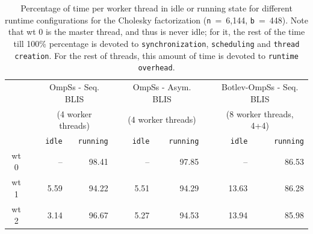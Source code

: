 \begin{table}
\centering
\caption{Percentage of time per worker thread in idle or running state for different runtime configurations for the Cholesky factorization 
({\tt n}~=~6,144, {\tt b}~=~448).
Note that {\sc wt 0} is the master thread, and thus is never idle; for it, the rest of the time till
100\% percentage is devoted to {\tt synchronization}, {\tt scheduling} and {\tt thread creation}. For the rest of threads, this amount of time is devoted to {\tt runtime overhead}.}
\label{tab:th_state}

\ca{2pt}

\renewcommand{\fg}[1]{{#1}} 
\renewcommand{\br}[1]{{#1}} 

{\scriptsize
\begin{tabular}{crrrrrrrrr} 
   	\toprule
                 & \phantom{a} & \multicolumn{2}{c}{OmpSs - Seq. BLIS} & \phantom{ab} & \multicolumn{2}{c}{OmpSs - Asym. BLIS} & \phantom{ab} & \multicolumn{2}{c}{Botlev-OmpSs - Seq. BLIS} \\ 
                 & \phantom{a} & \multicolumn{2}{c}{(4 worker threads)} & \phantom{ab} & \multicolumn{2}{c}{(4 worker threads)} & \phantom{ab} & \multicolumn{2}{c}{(8 worker threads, 4+4)} \\ 
                                          \cmidrule{3-4}                                         \cmidrule{6-7}                                      \cmidrule{9-10}
                       & \phantom{a} &    {\tt idle}& {\tt running}& \phantom{ab}  & {\tt idle}& {\tt running}& \phantom{ab} & {\tt idle}  & {\tt running} \\ \hline 
	 {\sc wt 0}    & \phantom{a} &    \fg{--}   & \fg{98.41}   & \phantom{ab}  & \fg{--}   & \fg{97.85}   & \phantom{ab} & \fg{--}     & \fg{86.53}    \\ \cline{3-10}
	 {\sc wt 1}    & \phantom{a} &    \br{5.59} & \fg{94.22}   & \phantom{ab}  & \fg{5.51} & \fg{94.29}   & \phantom{ab} & \fg{13.63}  & \fg{86.28}    \\ \cline{3-10}
	 {\sc wt 2}    & \phantom{a} &    \br{3.14} & \fg{96.67}   & \phantom{ab}  & \fg{5.27} & \fg{94.53}   & \phantom{ab} & \fg{13.94}  & \fg{85.98}    \\ \cline{3-10}

\end{tabular}}
\end{table}
